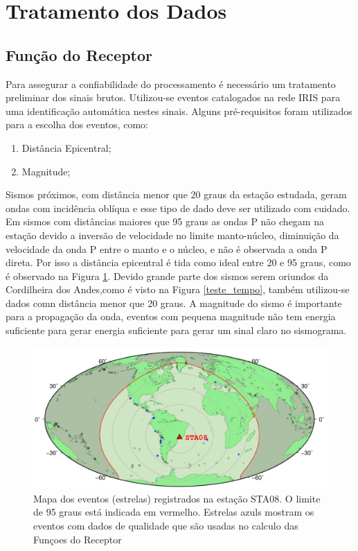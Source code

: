 \section{Tratamento dos Dados}

\subsection{Função do Receptor}

Para assegurar a confiabilidade do processamento é necessário um tratamento preliminar dos sinais brutos. Utilizou-se eventos catalogados na rede IRIS para uma identificação automática nestes sinais. Alguns pré-requisitos foram utilizados para a escolha dos eventos, como:

\begin{enumerate}
\item Distância Epicentral;
\item Magnitude;
\end{enumerate}

Sismos próximos, com distância menor que 20 graus da estação estudada, geram ondas com incidência oblíqua e esse tipo de dado deve ser utilizado com cuidado. Em sismos com distâncias maiores que 95 graus as ondas P não chegam na estação devido a inversão de velocidade no limite manto-núcleo, diminuição da velocidade da onda P entre o manto e o núcleo, e não é observada a onda P direta. Por isso a distância epicentral é tida como ideal entre 20 e 95 graus, como é observado na Figura \ref{mapa_eventos}. Devido grande parte dos sismos serem oriundos da Cordilheira dos Andes,como é visto na Figura \ref{teste_tempo}, também utilizou-se dados comn distância menor que 20 graus. A magnitude do sismo é importante para a propagação da onda, eventos com pequena magnitude não tem energia suficiente para gerar energia suficiente para gerar um sinal claro no sismograma.

\begin{figure}[!ht]
\centering
\includegraphics[scale=0.6]{mapa_de_eventos.png}
\caption{Mapa dos eventos (estrelas) registrados na estação STA08. O limite de 95 graus está indicada em vermelho. Estrelas azuls mostram os eventos com dados de qualidade que são usadas no calculo das Funçoes do Receptor}
\label{mapa_eventos}
\end{figure}


